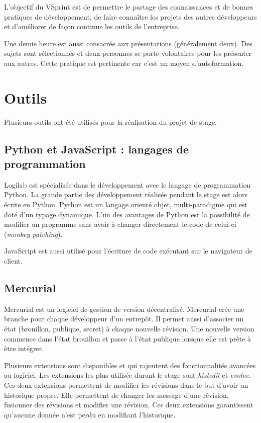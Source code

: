 L'objectif du VSprint est de permettre le partage des connaissances et de bonnes pratiques de développement, de faire connaître les projets des autres développeurs et d'améliorer de façon continue les outils de l'entreprise. 

Une demie heure est aussi consacrée aux présentations (généralement deux). Des sujets sont sélectionnés et deux personnes se porte volontaires pour les présenter aux autres. Cette pratique est pertinente car c'est un moyen d'autoformation.

\section{Outils}
Plusieurs outils ont été utilisés pour la réalisation du projet de stage. 

\subsection{Python et JavaScript : langages de programmation}
Logilab est spécialisée dans le développement avec le langage de programmation Python. La grande partie des développement réalisée pendant le stage est alors écrite en Python. Python est un langage orienté objet, multi-paradigme qui est doté d'un typage dynamique. L'un des avantages de Python est la possibilité de modifier un programme sans avoir à changer directement le code de celui-ci (\textit{monkey patching}).

JavaScript est aussi utilisé pour l'écriture de code exécutant sur le navigateur de client. 

\subsection{Mercurial}
Mercurial est un logiciel de gestion de version décentralisé. Mercurial crée une branche pour chaque développeur d'un entrepôt. Il permet aussi d'associer un état (brouillon, publique, secret) à chaque nouvelle révision. Une nouvelle version commence dans l'état brouillon et passe à l'état publique lorsque elle est prête à être intégrer. 

Plusieurs extensions sont disponibles et qui rajoutent des fonctionnalités avancées au logiciel. Les extensions les plus utilisée durant le stage sont \textit{histedit} et \textit{evolve}. Ces deux extensions permettent de modifier les révisions dans le but d'avoir un historique propre. Elle permettent de changer les message d'une révision, fusionner des révisions et modifier une révision. Ces deux extensions garantissent qu'aucune donnée n'est perdu en modifiant l'historique. 

